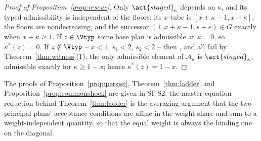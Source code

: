 \begin{proof}[Proof of Proposition~\ref{prop:rescue}]
Only $\act{staged}_\kappa$ depends on $\kappa$, and its typed admissibility is independent of the floors: its $x$-tube is $[x+\kappa-1,x+\kappa]$, the floors are nondecreasing, and the successor $(1,x+\kappa-1,s+e)\in G$ exactly when $x+\kappa\ge1$. If $z\in\Vtyp$ some base plan is admissible at $\kappa=0$, so $\kappa^*(z)=0$. If $z\notin\Vtyp$ -- $x<1$, $s_1<2$, $s_2<2$ -- then ,  and  all fail by Theorem~\ref{thm:witness}(1), the only admissible element of $\mathcal A_\kappa$ is $\act{staged}_\kappa$, admissible exactly for $\kappa\ge1-x$; hence $\kappa^*(z)=1-x$.
\end{proof}

\noindent The proofs of Proposition~\ref{prop:persist}, Theorem~\ref{thm:ladder} and Proposition~\ref{prop:commonshock} are given in SI~S2; the master-equation reduction behind Theorem~\ref{thm:ladder} is the averaging argument that the two principal plans' acceptance conditions are affine in the weight share and sum to a weight-independent quantity, so that the equal weight is always the binding one on the diagonal.

